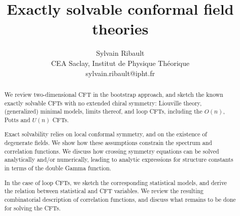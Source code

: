 \documentclass[12pt, a4paper]{article}
\title{\bfseries Exactly solvable conformal field theories}
\author{Sylvain Ribault \vspace{2mm}
\\
{\normalsize CEA Saclay, Institut de Physique Th\'eorique}
 \\
 {\footnotesize \ttfamily sylvain.ribault@ipht.fr }
}
\theoremstyle{break}
\begin{document}
\maketitle


\begin{abstract}
We review two-dimensional CFT in the bootstrap approach, and sketch the known exactly solvable CFTs with no extended chiral symmetry: Liouville theory, (generalized) minimal models, limits thereof, and loop CFTs, including the $O(n)$, Potts and $U(n)$ CFTs. 

Exact solvability relies on local conformal symmetry, and on the existence of degenerate fields. We show how these assumptions constrain the spectrum and correlation functions. We discuss how crossing symmetry equations can be solved analytically and/or numerically, leading to analytic expressions for structure constants in terms of the double Gamma function.  





In the case of loop CFTs, we sketch the corresponding statistical models, and derive the relation between statistical and CFT variables. We review the resulting combinatorial description of correlation functions, and discuss what remains to be done for solving the CFTs. 
\end{abstract}
\end{document}
